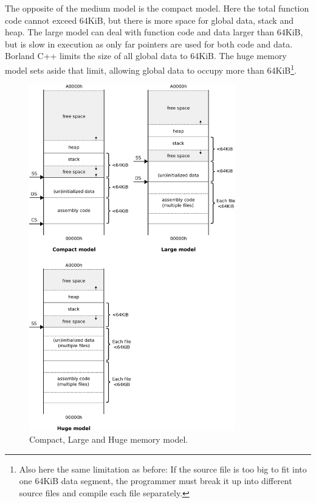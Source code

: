 \documentclass[book.tex]{subfiles}
\begin{document}
The opposite of the medium model is the compact model. Here the total function code cannot exceed 64KiB, but there is more space for global data, stack and heap. The large model can deal with function code and data larger than 64KiB, but is slow in execution as only far pointers are used for both code and data. Borland C++ limits the size of all global data to 64KiB. The huge memory model sets aside that limit, allowing global data to occupy more than 64KiB\footnote{Also here the same limitation as before: If the source file is too big to fit into one 64KiB data segment, the programmer must break it up into different source files and compile each file separately.}.\\

\begin{figure}[H]
\centering
\includegraphics[width=0.8\textwidth]{imgs/drawings/memory/compact_large_huge_mm.eps}
\caption{Compact, Large and Huge memory model.}
\label{fig:mm_huge}
\end{figure}
\par
\end{document}
